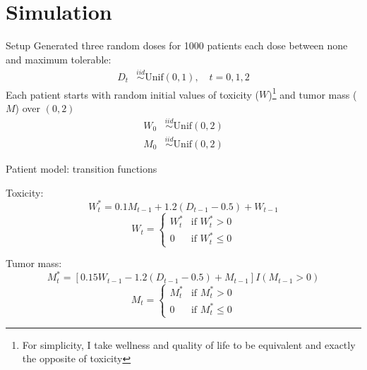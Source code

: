\documentclass[handout]{beamer}
\begin{document}


\section{Simulation} %
\label{sec:simulation}

\begin{frame}[c]{Setup}
  Generated three random doses for 1000 patients each dose between none and maximum tolerable:
  \begin{align*}
    D_{t} &\overset{iid}{\sim} \text{Unif}(0, 1), \quad t = 0, 1, 2
  \end{align*}
  Each patient starts with random initial values of toxicity ($W$)\footnote{For simplicity, I take wellness and quality of life to be equivalent and exactly the opposite of toxicity} and tumor mass ($M$) over $(0,2)$
  \begin{align*}
    W_{0} &\overset{iid}{\sim} \text{Unif}(0, 2) \\
    M_{0} &\overset{iid}{\sim} \text{Unif}(0, 2)
  \end{align*}
\end{frame}

\begin{frame}[c]{Patient model: transition functions}
  
  Toxicity:
  \begin{equation*}
  W^{*}_{t} = 0.1 M_{t-1} + 1.2 (D_{t-1} - 0.5) + W_{t - 1}
  \end{equation*}
  \begin{equation*}
  W_{t} = \begin{cases}
    W^{*}_{t} &\text{if } W^{*}_{t} > 0 \\
    0 &\text{if } W^{*}_{t} \leq 0
  \end{cases}
  \end{equation*}
  
  Tumor mass:
  \begin{equation*}
  M^{*}_{t} = [0.15 W_{t-1} - 1.2 (D_{t-1} - 0.5) + M_{t - 1}] I(M_{t-1} > 0)
  \end{equation*}
  \begin{equation*}
  M_{t} = \begin{cases}
    M^{*}_{t} &\text{if } M^{*}_{t} > 0 \\
    0 &\text{if } M^{*}_{t} \leq 0
  \end{cases}
  \end{equation*}
  
\end{frame}
\end{document}
